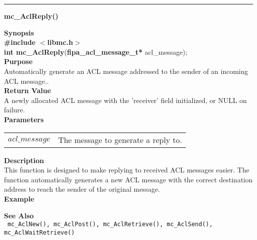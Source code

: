 \noindent
\vspace{5pt}
\rule{6.5in}{0.015in}
\noindent
{}
{\LARGE \bf mc\_AclReply()}\\
\label{api:mc_AclReply()}

\noindent
{\bf Synopsis}\\
{\bf \#include $<$libmc.h$>$}\\
{\bf int mc\_AclReply}({\bf fipa\_acl\_message\_t*} acl\_message);\\

\noindent
{\bf Purpose}\\
Automatically generate an ACL message addressed to the sender of an
incoming ACL message..\\

\noindent
{\bf Return Value}\\
A newly allocated ACL message with the 'receiver' field initialized, or
NULL on failure.\\

\noindent
{\bf Parameters}
\vspace{-0.1in}
\begin{description}
\item
\begin{tabular}{p{10 mm}p{145 mm}} 
$acl\_message$ & The message to generate a reply to.
\end{tabular}
\end{description}

\noindent
{\bf Description}\\
This function is designed to make replying to received ACL messages easier.
The function automatically generates a new ACL message with the correct
destination address to reach the sender of the original message.\\

\noindent
{\bf Example}\\
\noindent

\noindent
{\bf See Also}\\
\texttt{
  mc\_AclNew(), mc\_AclPost(), mc\_AclRetrieve(), mc\_AclSend(), 
    \linebreak mc\_AclWaitRetrieve()
}

